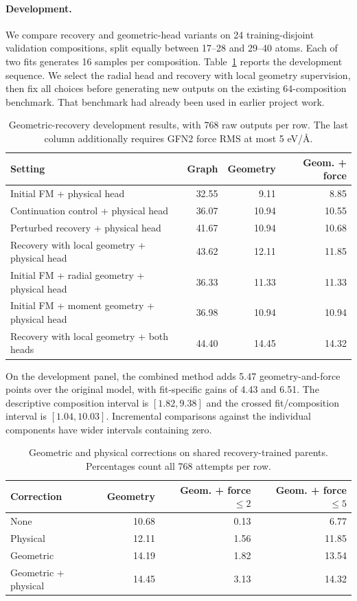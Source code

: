 \paragraph{Development.}
We compare recovery and geometric-head variants on 24 training-disjoint validation compositions, split equally between 17--28 and 29--40 atoms. Each of two fits generates 16 samples per composition. Table~\ref{tab:geometry-development} reports the development sequence. We select the radial head and recovery with local geometry supervision, then fix all choices before generating new outputs on the existing 64-composition benchmark. That benchmark had already been used in earlier project work.

\begin{table}[htbp]\centering\small
\caption{Geometric-recovery development results, with 768 raw outputs per row. The last column additionally requires GFN2 force RMS at most 5 eV/\AA.}
\begin{tabular}{p{.49\linewidth}rrr}\toprule
Setting & Graph & Geometry & Geom. + force\\\midrule
Initial FM + physical head &32.55&9.11&8.85\\
Continuation control + physical head &36.07&10.94&10.55\\
Perturbed recovery + physical head &41.67&10.94&10.68\\
Recovery with local geometry + physical head &43.62&12.11&11.85\\
Initial FM + radial geometry + physical head &36.33&11.33&11.33\\
Initial FM + moment geometry + physical head &36.98&10.94&10.94\\
Recovery with local geometry + both heads &44.40&14.45&14.32\\\bottomrule
\end{tabular}\label{tab:geometry-development}\end{table}

On the development panel, the combined method adds 5.47 geometry-and-force points over the original model, with fit-specific gains of 4.43 and 6.51. The descriptive composition interval is $[1.82,9.38]$ and the crossed fit/composition interval is $[1.04,10.03]$. Incremental comparisons against the individual components have wider intervals containing zero.

\begin{table}[htbp]\centering\small
\caption{Geometric and physical corrections on shared recovery-trained parents. Percentages count all 768 attempts per row.}
\begin{tabular}{lrrr}\toprule
Correction & Geometry & Geom. + force $\leq2$ & Geom. + force $\leq5$\\\midrule
None &10.68&0.13&6.77\\
Physical &12.11&1.56&11.85\\
Geometric &14.19&1.82&13.54\\
Geometric + physical &14.45&3.13&14.32\\\bottomrule
\end{tabular}\label{tab:geometric-physical-fields}\end{table}

